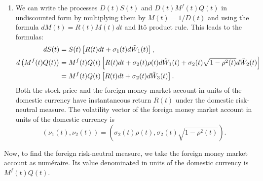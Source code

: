 \documentclass[11pt,a4,table]{article}
\begin{document}
\begin{enumerate}
\begin{enumerate}
        \item We can write the processes $D(t)S(t)$ and $D(t)M^f(t)Q(t)$ in undiscounted form by multiplying them by $M(t)=1/D(t)$ and using the formula $dM(t) = R(t)M(t) dt$ and Itô product rule. This leads to the formulas:
        \begin{align}
            dS(t) &= S(t)\left[R(t) dt + \sigma_1(t) d\Tilde{W}_1(t)\right],\\
            d\left(M^f(t)Q(t)\right) &= M^f(t)Q(t) \left[R(t) dt + \sigma_2(t)\rho(t) d\Tilde{W}_1(t) + \sigma_2(t) \sqrt{1-\rho^2(t)} d\Tilde{W}_2(t)\right] \nonumber\\
            &= M^f(t)Q(t)\left[R(t) dt + \sigma_2(t) d\Tilde{W}_3(t)\right].
        \end{align}
        Both the stock price and the foreign money market account in units of the domestic currency have instantaneous return $R(t)$ under the domestic risk-neutral measure. The volatility vector of the foreign money market account in units of the domestic currency is
        \begin{equation*}
            (\nu_1(t),\nu_2(t)) = \left(\sigma_2(t)\rho(t),\sigma_2(t)\sqrt{1-\rho^2(t)}\right).
        \end{equation*}
    \end{enumerate} 
    
    
    Now, to find the foreign risk-neutral measure, we take the foreign money market account as numéraire. Its value denominated in units of the domestic currency is $M^f(t)Q(t)$.
    \begin{enumerate}
        \setcounter{enumii}{5}
        

\end{enumerate}
\end{enumerate}
\end{document}
